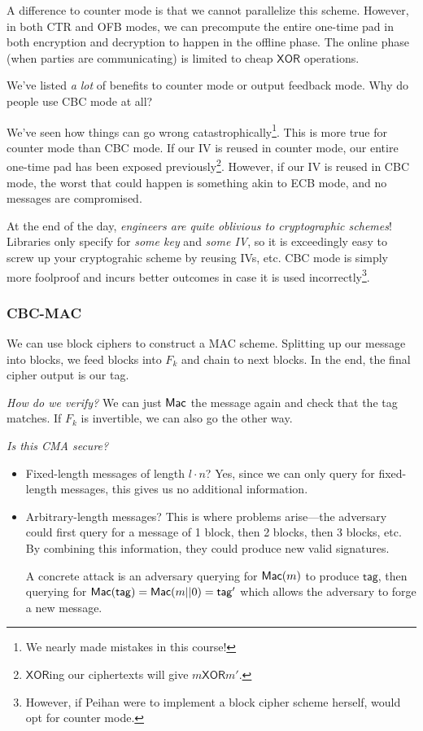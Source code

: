 A difference to counter mode is that we cannot parallelize this scheme. However, in both CTR and OFB modes, we can precompute the entire one-time pad in both encryption and decryption to happen in the offline phase. The online phase (when parties are communicating) is limited to cheap $\mathsf{XOR}$ operations.

\begin{ques*}
    We've listed \emph{a lot} of benefits to counter mode or output feedback mode. Why do people use CBC mode at all?
\end{ques*}
We've seen how things can go wrong catastrophically\footnote{We nearly made mistakes in this course!}. This is more true for counter mode than CBC mode. If our IV is reused in counter mode, our entire one-time pad has been exposed previously\footnote{$\mathsf{XOR}$ing our ciphertexts will give $m \mathsf{XOR} m'$.}. However, if our IV is reused in CBC mode, the worst that could happen is something akin to ECB mode, and no messages are compromised.

At the end of the day, \emph{engineers are quite oblivious to cryptographic schemes}! Libraries only specify for \emph{some key} and \emph{some IV}, so it is exceedingly easy to screw up your cryptograhic scheme by reusing IVs, etc. CBC mode is simply more foolproof and incurs better outcomes in case it is used incorrectly\footnote{However, if Peihan were to implement a block cipher scheme herself, would opt for counter mode.}.

\subsubsection{CBC-MAC}
We can use block ciphers to construct a MAC scheme. Splitting up our message into blocks, we feed blocks into $F_k$ and chain to next blocks. In the end, the final cipher output is our tag.


\emph{How do we verify?} We can just $\operatorname{\mathsf{Mac}}$ the message again and check that the tag matches. If $F_k$ is invertible, we can also go the other way.

\emph{Is this CMA secure?}
\begin{itemize}
    \item
          Fixed-length messages of length $l\cdot n$? Yes, since we can only query for fixed-length messages, this gives us no additional information.
    \item
          Arbitrary-length messages? This is where problems arise---the adversary could first query for a message of 1 block, then 2 blocks, then 3 blocks, etc. By combining this information, they could produce new valid signatures.

          A concrete attack is an adversary querying for $\operatorname{\mathsf{Mac}}(m)$ to produce $\mathsf{tag}$, then querying for $\operatorname{\mathsf{Mac}}(\mathsf{tag}) = \operatorname{\mathsf{Mac}}(m||0) = \mathsf{tag}'$ which allows the adversary to forge a new message.
\end{itemize}

